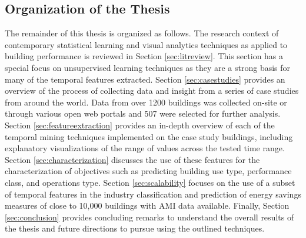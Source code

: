 \subsection{Organization of the Thesis}
\label{sec:organization}

The remainder of this thesis is organized as follows. The research context of contemporary statistical learning and visual analytics techniques as applied to building performance is reviewed in Section \ref{sec:litreview}. This section has a special focus on unsupervised learning techniques as they are a strong basis for many of the temporal features extracted. Section \ref{sec:casestudies} provides an overview of the process of collecting data and insight from a series of case studies from around the world. Data from over 1200 buildings was collected on-site or through various open web portals and 507 were selected for further analysis. Section \ref{sec:featureextraction} provides an in-depth overview of each of the temporal mining techniques implemented on the case study buildings, including explanatory visualizations of the range of values across the tested time range. Section \ref{sec:characterization} discusses the use of these features for the characterization of objectives such as predicting building use type, performance class, and operations type. Section \ref{sec:scalability} focuses on the use of a subset of temporal features in the industry classification and prediction of energy savings measures of close to 10,000 buildings with AMI data available. Finally, Section \ref{sec:conclusion} provides concluding remarks to understand the overall results of the thesis and future directions to pursue using the outlined techniques.
